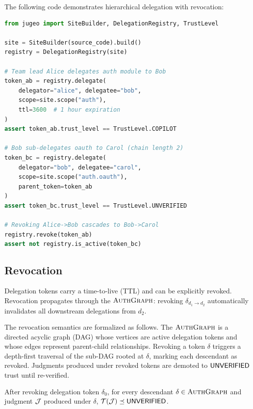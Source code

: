 \documentclass[11pt]{article}
\newcommand{\AuthGraph}{\textsc{AuthGraph}}
\begin{document}
\begin{example}
The following code demonstrates hierarchical delegation with revocation:

\begin{lstlisting}[language=Python,basicstyle=\small\ttfamily,frame=single,
  xleftmargin=1em]
from jugeo import SiteBuilder, DelegationRegistry, TrustLevel

site = SiteBuilder(source_code).build()
registry = DelegationRegistry(site)

# Team lead Alice delegates auth module to Bob
token_ab = registry.delegate(
    delegator="alice", delegatee="bob",
    scope=site.scope("auth"),
    ttl=3600  # 1 hour expiration
)
assert token_ab.trust_level == TrustLevel.COPILOT

# Bob sub-delegates oauth to Carol (chain length 2)
token_bc = registry.delegate(
    delegator="bob", delegatee="carol",
    scope=site.scope("auth.oauth"),
    parent_token=token_ab
)
assert token_bc.trust_level == TrustLevel.UNVERIFIED

# Revoking Alice->Bob cascades to Bob->Carol
registry.revoke(token_ab)
assert not registry.is_active(token_bc)
\end{lstlisting}
\end{example}

\subsection{Revocation}

Delegation tokens carry a time-to-live (TTL) and can be explicitly revoked.
Revocation propagates through the $\AuthGraph$: revoking $\delta_{d_1 \to d_2}$
automatically invalidates all downstream delegations from $d_2$.

The revocation semantics are formalized as follows. The $\AuthGraph$ is a
directed acyclic graph (DAG) whose vertices are active delegation tokens and
whose edges represent parent-child relationships. Revoking a token $\delta$
triggers a depth-first traversal of the sub-DAG rooted at $\delta$, marking
each descendant as revoked. Judgments produced under revoked tokens are demoted
to $\mathsf{UNVERIFIED}$ trust until re-verified.

\begin{proposition}
After revoking delegation token $\delta_0$, for every descendant
$\delta \in \AuthGraph$ and judgment $\mathcal{J}$ produced under $\delta$,
$\mathcal{T}(\mathcal{J}) \preceq \mathsf{UNVERIFIED}$.
\end{proposition}
\end{document}
